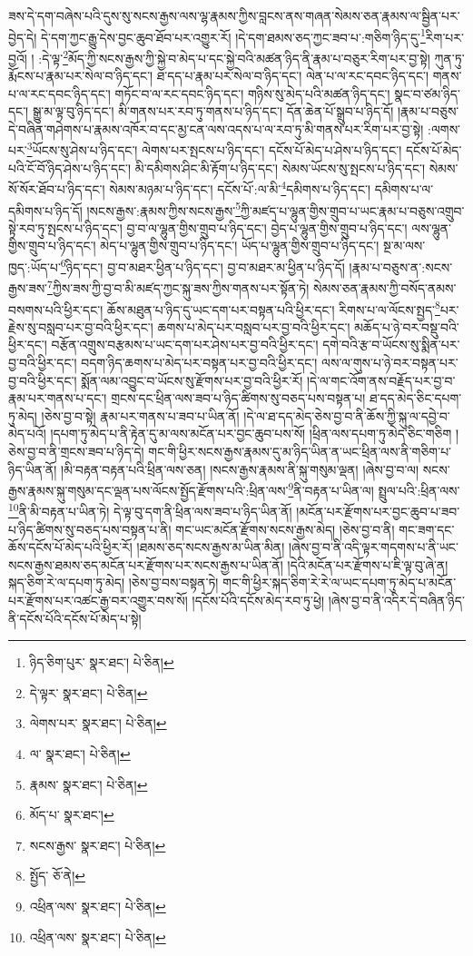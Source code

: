ཟས་དེ་དག་བཞེས་པའི་དུས་སུ་སངས་རྒྱས་ལས་ལྷ་རྣམས་ཀྱིས་བླངས་ནས་གཞན་སེམས་ཅན་རྣམས་ལ་སྦྱིན་པར་བྱེད་དེ། དེ་དག་ཀྱང་རྒྱུ་དེས་བྱང་ཆུབ་ཐོབ་པར་འགྱུར་རོ། །དེ་དག་ཐམས་ཅད་ཀྱང་ཟབ་པ་:གཅིག་ཉིད་དུ་\footnote{ཉིད་ཅིག་པུར་  སྣར་ཐང་།  པེ་ཅིན། }རིག་པར་བྱའོ། །
:དེ་ལྟ་\footnote{དེ་ལྟར་  སྣར་ཐང་།  པེ་ཅིན། }མོད་ཀྱི་སངས་རྒྱས་ཀྱི་སྐྱེ་བ་མེད་པ་དང་སྐྱེ་བའི་མཚན་ཉིད་ནི་རྣམ་པ་བཅུར་རིག་པར་བྱ་སྟེ། ཀུན་ཏུ་རྨོངས་པ་རྣམ་པར་སེལ་བ་ཉིད་དང་། ཐ་དད་པ་རྣམ་པར་སེལ་བ་ཉིད་དང་། ལེན་པ་ལ་རང་དབང་ཉིད་དང་། གནས་པ་ལ་རང་དབང་ཉིད་དང་། གཏོང་བ་ལ་རང་དབང་ཉིད་དང་། གཉིས་སུ་མེད་པའི་མཚན་ཉིད་དང་། སྣང་བ་ཙམ་ཉིད་དང་། སྒྱུ་མ་ལྟ་བུ་ཉིད་དང་། མི་གནས་པར་རབ་ཏུ་གནས་པ་ཉིད་དང་། དོན་ཆེན་པོ་སྒྲུབ་པ་ཉིད་དོ། །རྣམ་པ་བཅུས་དེ་བཞིན་གཤེགས་པ་རྣམས་འཁོར་བ་དང་མྱ་ངན་ལས་འདས་པ་ལ་རབ་ཏུ་མི་གནས་པར་རིག་པར་བྱ་སྟེ། :ལགས་པར་\footnote{ལེགས་པར་  སྣར་ཐང་།  པེ་ཅིན། }ཡོངས་སུ་ཤེས་པ་ཉིད་དང་། ལེགས་པར་སྤངས་པ་ཉིད་དང་། དངོས་པོ་མེད་པ་ཤེས་པ་ཉིད་དང་། དངོས་པོ་མེད་པའི་ངོ་བོ་ཉིད་ཤེས་པ་ཉིད་དང་། མི་དམིགས་ཤིང་མི་རྟོག་པ་ཉིད་དང་། སེམས་ཡོངས་སུ་སྤངས་པ་ཉིད་དང་། སེམས་སོ་སོར་ཐོབ་པ་ཉིད་དང་། སེམས་མཉམ་པ་ཉིད་དང་། དངོས་པོ་:ལ་མི་\footnote{ལ་  སྣར་ཐང་།  པེ་ཅིན། }དམིགས་པ་ཉིད་དང་། དམིགས་པ་ལ་དམིགས་པ་ཉིད་དོ། །སངས་རྒྱས་:རྣམས་ཀྱིས་སངས་རྒྱས་\footnote{རྣམས་  སྣར་ཐང་།  པེ་ཅིན། }ཀྱི་མཛད་པ་ལྷུན་གྱིས་གྲུབ་པ་ཡང་རྣམ་པ་བཅུས་འགྲུབ་སྟེ་རབ་ཏུ་སྤངས་པ་ཉིད་དང་། བྱ་བ་ལ་ལྷུན་གྱིས་གྲུབ་པ་ཉིད་དང་། བྱེད་པ་ལྷུན་གྱིས་གྲུབ་པ་ཉིད་དང་། ལས་ལྷུན་གྱིས་གྲུབ་པ་ཉིད་དང་། མེད་པ་ལྷུན་གྱིས་གྲུབ་པ་ཉིད་དང་། ཡོད་པ་ལྷུན་གྱིས་གྲུབ་པ་ཉིད་དང་། སྔ་མ་ལས་ཁྱད་:ཡོད་པ་\footnote{མོད་པ་  སྣར་ཐང་། }ཉིད་དང་། བྱ་བ་མཐར་ཕྱིན་པ་ཉིད་དང་། བྱ་བ་མཐར་མ་ཕྱིན་པ་ཉིད་དོ། །རྣམ་པ་བཅུས་ན་:སངས་རྒྱས་ཟས་\footnote{སངས་རྒྱས་  སྣར་ཐང་།  པེ་ཅིན། }ཀྱིས་ཟས་ཀྱི་བྱ་བ་མི་མཛད་ཀྱང་སྐུ་ཟས་ཀྱིས་གནས་པར་སྟོན་ཏེ། སེམས་ཅན་རྣམས་ཀྱི་བསོད་ནམས་བསགས་པའི་ཕྱིར་དང་། ཆོས་མཐུན་པ་ཉིད་དུ་ཡང་དག་པར་བསྟན་པའི་ཕྱིར་དང་། རིགས་པ་ལ་ལོངས་སྤྱད་\footnote{སྤྱོད་  ཅོ་ནེ། }པར་རྗེས་སུ་བསླབ་པར་བྱ་བའི་ཕྱིར་དང་། ཆགས་པ་མེད་པར་བསླབ་པར་བྱ་བའི་ཕྱིར་དང་། མཆོད་པ་ཉེ་བར་བསྡུ་བའི་ཕྱིར་དང་། བརྩོན་འགྲུས་བརྩམས་པ་ཡང་དག་པར་ཤེས་པར་བྱ་བའི་ཕྱིར་དང་། དགེ་བའི་རྩ་བ་ཡོངས་སུ་སྨིན་པར་བྱ་བའི་ཕྱིར་དང་། བདག་ཉིད་ཆགས་པ་མེད་པར་བསྟན་པར་བྱ་བའི་ཕྱིར་དང་། ལས་ལ་གུས་པ་ཉེ་བར་བསྟན་པར་བྱ་བའི་ཕྱིར་དང་། སྨོན་ལམ་འབྱུང་བ་ཡོངས་སུ་རྫོགས་པར་བྱ་བའི་ཕྱིར་རོ། །དེ་ལ་གང་འོག་ནས་བརྗོད་པར་བྱ་བ་རྣམ་པར་གནས་པ་དང་། གྲངས་དང་ཕྲིན་ལས་ཟབ་པ་ཉིད་ཚིགས་སུ་བཅད་པས་བསྟན་པ། ཐ་དད་མེད་ཅིང་དཔག་ཏུ་མེད། །ཅེས་བྱ་བ་སྟེ། རྣམ་པར་གནས་པ་ཟབ་པ་ཡིན་ནོ། །དེ་ལ་ཐ་དད་མེད་ཅེས་བྱ་བ་ནི་ཆོས་ཀྱི་སྐུ་ལ་དབྱེ་བ་མེད་པའོ། །དཔག་ཏུ་མེད་པ་ནི་རྟེན་དུ་མ་ལས་མངོན་པར་བྱང་ཆུབ་པས་སོ། །ཕྲིན་ལས་དཔག་ཏུ་མེད་ཅིང་གཅིག །ཅེས་བྱ་བ་ནི་གྲངས་ཟབ་པ་ཉིད་དེ། གང་གི་ཕྱིར་སངས་རྒྱས་རྣམས་དུ་མ་ཉིད་ཡིན་ན་ཡང་ཕྲིན་ལས་ནི་གཅིག་པ་ཉིད་ཡིན་ནོ། །མི་བརྟན་བརྟན་པའི་ཕྲིན་ལས་ཅན། །སངས་རྒྱས་རྣམས་ནི་སྐུ་གསུམ་ལྡན། །ཞེས་བྱ་བ་ལ། སངས་རྒྱས་རྣམས་སྐུ་གསུམ་དང་ལྡན་པས་ལོངས་སྤྱོད་རྫོགས་པའི་:ཕྲིན་ལས་\footnote{འཕྲིན་ལས་  སྣར་ཐང་།  པེ་ཅིན། }ནི་བརྟན་པ་ཡིན་ལ། སྤྲུལ་པའི་:ཕྲིན་ལས་\footnote{འཕྲིན་ལས་  སྣར་ཐང་།  པེ་ཅིན། }ནི་མི་བརྟན་པ་ཡིན་ཏེ། དེ་ལྟ་བུ་དག་ནི་ཕྲིན་ལས་ཟབ་པ་ཉིད་ཡིན་ནོ། །མངོན་པར་རྫོགས་པར་བྱང་ཆུབ་པ་ཟབ་པ་ཉིད་ཚིགས་སུ་བཅད་པས་བསྟན་པ་ནི། གང་ཡང་མངོན་རྫོགས་སངས་རྒྱས་མེད། །ཅེས་བྱ་བ་ནི། གང་ཟག་དང་ཆོས་དངོས་པོ་མེད་པའི་ཕྱིར་རོ། །ཐམས་ཅད་སངས་རྒྱས་མ་ཡིན་མིན། །ཞེས་བྱ་བ་ནི་འདི་ལྟར་གདགས་པ་ནི་ཡང་སངས་རྒྱས་ཐམས་ཅད་མངོན་པར་རྫོགས་པར་སངས་རྒྱས་པ་ཡིན་ནོ། །དེའི་མངོན་པར་རྫོགས་པ་ཇི་ལྟ་བུ་ཞེ་ན། སྐད་ཅིག་རེ་ལ་དཔག་ཏུ་མེད། །ཅེས་བྱ་བས་བསྟན་ཏེ། གང་གི་ཕྱིར་སྐད་ཅིག་རེ་རེ་ལ་ཡང་དཔག་ཏུ་མེད་པ་མངོན་པར་རྫོགས་པར་འཚང་རྒྱ་བར་འགྱུར་བས་སོ། །དངོས་པོའི་དངོས་མེད་རབ་ཏུ་ཕྱེ། །ཞེས་བྱ་བ་ནི་འདིར་དེ་བཞིན་ཉིད་ནི་དངོས་པོའི་དངོས་པོ་མེད་པ་སྟེ། 